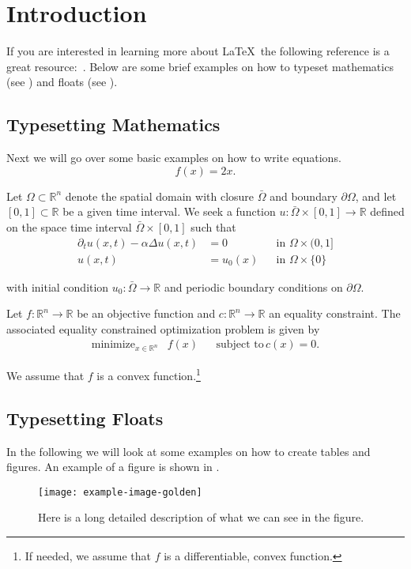 \chapter{Introduction}


If you are interested in learning more about \LaTeX\ the following reference is a great resource:~\cite{Oetiker:2018a}. Below are some brief examples on how to typeset mathematics (see ) and floats (see ).



\section{Typesetting Mathematics}
\label{s:type-math}

Next we will go over some basic examples on how to write equations.
\begin{equation}
f(x) = 2x.
\end{equation}

Let $\Omega\subset\mathbb{R}^n$ denote the spatial domain with closure $\bar{\Omega}$ and boundary $\partial\Omega$, and let $[0,1]\subset\mathbb{R}$ be a given time interval. We seek a function $u : \bar{\Omega} \times [0,1]\to \mathbb{R}$ defined on the space time interval $\bar{\Omega} \times [0,1]$ such that
\begin{align}
\partial_t u(x,t) - \alpha\Delta u(x,t) & = 0      && \text{in }\Omega\times(0,1] \\
                                 u(x,t) & = u_0(x) && \text{in }\Omega\times\{0\}
\end{align}

\noindent with initial condition $u_0: \bar{\Omega}\to\mathbb{R}$ and periodic boundary conditions on $\partial\Omega$.


Let $f : \mathbb{R}^n \to \mathbb{R}$ be an objective function and $c : \mathbb{R}^n \to \mathbb{R}$ an equality constraint. The associated equality constrained optimization problem is given by
\begin{align}
\operatorname{minimize}_{x\in\mathbb{R}^n} & f(x) && \text{subject to}\, c(x) = 0.
\end{align}

We assume that $f$ is a convex function.\footnote{If needed, we assume that $f$ is a differentiable, convex function.}




\section{Typesetting Floats}
\label{s:type-floats}



In the following we will look at some examples on how to create tables and figures. An example of a figure is shown in .


\begin{figure}
\centering
\texttt{[image: example-image-golden]}
\caption{Here is a long detailed description of what we can see in the figure.\label{f:golden-ratio}}
\end{figure}



